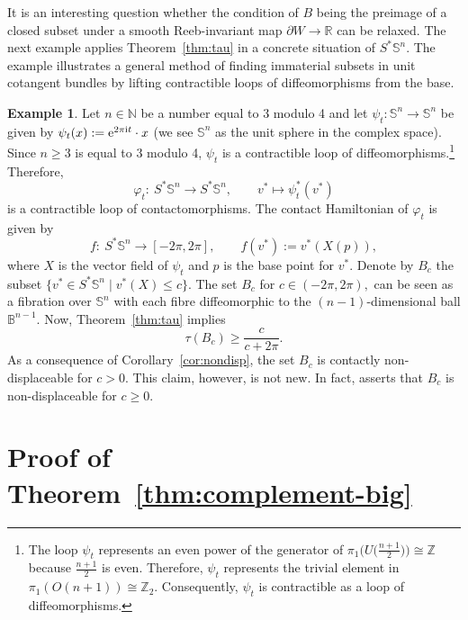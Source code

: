\documentclass[10pt,a4paper]{amsart}
\numberwithin{equation}{section}
\theoremstyle{definition}
\newtheorem{Example}[Theorem]{Example}
\begin{document}
It is an interesting question whether the condition of $B$ being the preimage of a closed subset under a smooth Reeb-invariant map $\partial W\to \mathbb{R}$ can be relaxed.
The next example applies Theorem~\ref{thm:tau} in a concrete situation of $S^\ast \mathbb{S}^n$. The example illustrates a general method of finding immaterial subsets in unit cotangent bundles by lifting contractible loops of diffeomorphisms from the base.

\begin{Example}
Let $n\in\mathbb{N}$ be a number equal to 3 modulo 4 and let $\psi_t\colon \mathbb{S}^n\to\mathbb{S}^n$ be given by $\psi_t(x):= {\rm e}^{2\pi {\rm i} t}\cdot x$ (we see $\mathbb{S}^n$ as the unit sphere in the complex space). Since $n\geqslant 3$ is equal to 3 modulo 4, $\psi_t$ is a contractible loop of diffeomorphisms.\footnote{The loop $\psi_t$ represents an even power of the generator of $\pi_1\bigl(U\bigl(\frac{n+1}{2}\bigr)\bigr)\cong\mathbb{Z}$ because $\frac{n+1}{2}$ is even. Therefore, $\psi_t$ represents the trivial element in $\pi_1(O(n+1))\cong\mathbb{Z}_2$. Consequently, $\psi_t$ is contractible as a loop of diffeomorphisms.} Therefore,
\[
\varphi_t\colon \ S^\ast\mathbb{S}^n\to S^\ast\mathbb{S}^n, \qquad v^\ast\mapsto \psi^\ast_t(v^\ast)
\]
is a contractible loop of contactomorphisms. The contact Hamiltonian of $\varphi_t$ is given by
\[
f\colon \ S^\ast\mathbb{S}^n\to[-2\pi, 2\pi], \qquad f(v^\ast):= v^\ast(X(p)),
\]
where $X$ is the vector field of $\psi_t$ and $p$ is the base point for $v^\ast$. Denote by $B_c$ the subset $\{v^\ast\in S^\ast\mathbb{S}^n\mid v^\ast(X)\leqslant c\}$. The set $B_c$ for $c\in(-2\pi, 2\pi), $ can be seen as a fibration over $\mathbb{S}^n$ with each fibre diffeomorphic to the $(n-1)$-dimensional ball $\mathbb{B}^{n-1}$. Now, Theorem~\ref{thm:tau} implies
\[ \tau(B_c)\geqslant \frac{c}{c+2\pi}. \]
As a consequence of Corollary~\ref{cor:nondisp}, the set $B_c$ is contactly non-displaceable for $c>0$. This claim, however, is not new. In fact, \cite[Example~2.11]{sun2026contact} asserts that $B_c$ is non-displaceable for $c\geqslant 0$.
\end{Example}


\section{Proof of Theorem~\ref{thm:complement-big}}\label{sec:proofSH}
\end{document}
